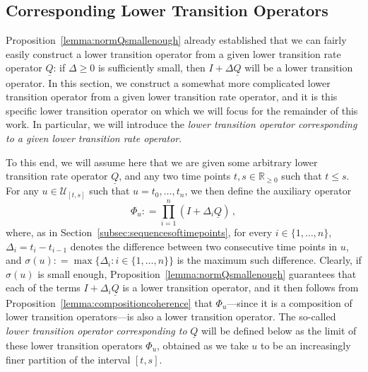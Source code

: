 \documentclass[10pt,a4paper]{paper}
\theoremstyle{definition}
\newtheorem{lemma}[theorem]{Lemma}
\newcommand{\reals}{\mathbb{R}}
\newcommand{\realsnonneg}{\reals_{\geq 0}}
\newcommand{\states}{\mathcal{X}}
\newcommand{\lt}{\underline{T}}
\newcommand{\gambles}{\mathcal{L}}
\newcommand{\gamblesX}{\gambles(\states)}
\newcommand{\lrate}{\underline{Q}}
\newcommand{\norm}[1]{\left\lVert #1 \right\rVert}
\newcommand{\coloneqq}{:\!=}
\begin{document}

\subsection{Corresponding Lower Transition Operators}

Proposition~\ref{lemma:normQsmallenough} already established that we can fairly easily construct a lower transition operator from a given lower transition rate operator $\lrate$: if $\Delta\geq0$ is sufficiently small, then $I+\Delta\lrate$ will be a lower transition operator. In this section, we construct a somewhat more complicated lower transition operator from a given lower transition rate operator, and it is this specific lower transition operator on which we will focus for the remainder of this work. In particular, we will introduce the \emph{lower transition operator corresponding to a given lower transition rate operator}.

To this end, we will assume here that we are given some arbitrary lower transition rate operator $\lrate$, and any two time points $t,s\in\realsnonneg$ such that $t\leq s$. For any $u\in\mathcal{U}_{[t,s]}$ such that $u=t_0,\ldots,t_n$, we then define the auxiliary operator
\begin{equation}\label{eq:aux_lower_trans}
\Phi_u\coloneqq\prod_{i=1}^n(I+\Delta_i\lrate)\,,
\end{equation}
where, as in Section~\ref{subsec:sequencesoftimepoints}, for every $i\in\{1,\ldots,n\}$, $\Delta_i= t_i-t_{i-1}$ denotes the difference between two consecutive time points in $u$, and $\sigma(u)\coloneqq \max\{\Delta_i:i\in\{1,\ldots,n\}\}$ is the maximum such difference. Clearly, if $\sigma(u)$ is small enough, Proposition~\ref{lemma:normQsmallenough} guarantees that each of the terms $I+\Delta_i\lrate$ is a lower transition operator, and it then follows from Proposition~\ref{lemma:compositioncoherence} that $\Phi_u$---since it is a composition of lower transition operators---is also a lower transition operator. The so-called \emph{lower transition operator corresponding to} $\lrate$ will be defined below as the limit of these lower transition operators $\Phi_u$, obtained as we take $u$ to be an increasingly finer partition of the interval $[t,s]$.
\end{document}
